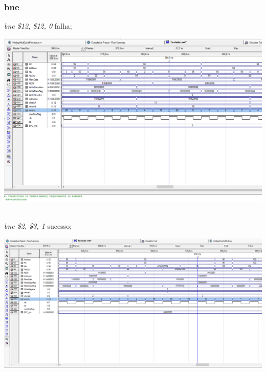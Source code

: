 \documentclass{article}
\begin{document}
    \subsubsection{bne}
    {\it bne \$12, \$12, 0} falha;\\
    \begin{center}
        \includegraphics[scale=0.25]{bnefalha.PNG}
    \end{center}
    \\
    {\it bne \$2, \$3, 1} sucesso;\\
    \begin{center}
        \includegraphics[scale=0.25]{bnesucesso.PNG}
    \end{center}
    
    \\
\end{document}
